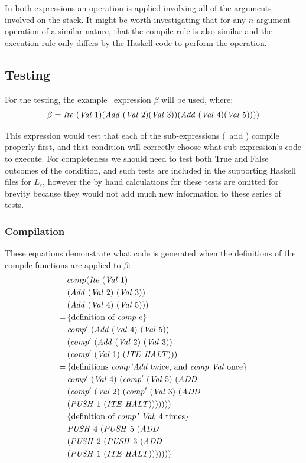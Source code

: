\documentclass {article}
\begin{document}
In both expressions an operation is applied involving all 
of the arguments involved on the stack. It might be worth
investigating that for any $n$ argument operation of a similar
nature, that the compile rule is also similar and the 
execution rule only differs by the Haskell 
code to perform the operation.


\subsection{Testing}\label{itetests}

For the testing, the example \ite\ expression $\beta$ will be used, where:
\[\beta = \mathit{Ite\ } (\mathit{Val\ } 1) 
	(\mathit{Add\ } (\mathit{Val\ } 2) (\mathit{Val\ } 3)) (\mathit{Add\ } (\mathit{Val\ } 4) (\mathit{Val\ } 5)))) \]

This expression would test that
each of the sub-expressions 
(\add\ and \val) compile properly first, 
and that condition will correctly  choose what
 sub expression's code to execute.
For completeness we should need to 
test both True and False outcomes of the condition, and
such tests are included in the supporting Haskell files for $L_c$, 
however the by hand calculations for these tests are omitted
for brevity because they would not add much new
information to these series of tests.

\subsubsection{Compilation}

These equations demonstrate what code is generated
when the definitions of the compile functions are applied to $\beta$:
\begin{align*}
	&comp (\mathit{Ite\ }	(\mathit{Val\ } 1) \\
				&(\mathit{Add\ } (\mathit{Val\ } 2)\ (\mathit{Val\ } 3)) \\
				& (\mathit{Add\ } (\mathit{Val\ } 4)\ (\mathit{Val\ } 5))) \\
	=\, & \{ \mbox{definition of \textit{comp}\ $e$} \}\ \\ 
	&\mathit{comp'\ }  (\mathit{Add\ } (\mathit{Val\ } 4)\ (\mathit{Val\ } 5))\\
		&(\mathit{comp'\ }  (\mathit{Add\ } (\mathit{Val\ } 2)\ (\mathit{Val\ } 3))\\
			&(\mathit{comp'\ }  (\mathit{Val\ } 1)\ (\mathit{ITE\ }  \mathit{HALT}))) \\
	=\, & \{ \mbox{definitions \textit{comp'}\textit{Add}\ twice, 
					and \textit{comp}\ \textit{Val}\ once} \} \\
	&\mathit{comp'\ }  (\mathit{Val\ } 4)\ (\mathit{comp'\ }  (\mathit{Val\ } 5)\ (\mathit{ADD\ }  \\
	&(\mathit{comp'\ }  (\mathit{Val\ } 2)\ (\mathit{comp'\ }  (\mathit{Val\ } 3)\ (\mathit{ADD\ }  \\
	&(\mathit{PUSH\ } 1\ (\mathit{ITE\ } \mathit{HALT}))))))) \\
	=\, & \{ \mbox{definition of \textit{comp'}\ \textit{Val}, 4 times} \} \\
	&\mathit{PUSH\ } 4\ (\mathit{PUSH\ } 5\ (\mathit{ADD\ } \\
			&(\mathit{PUSH\ } 2\ (\mathit{PUSH\ } 3\ (\mathit{ADD\ } \\
			&(\mathit{PUSH\ } 1\ (\mathit{ITE\ } \mathit{HALT})))))))
\end{align*}
\end{document}
